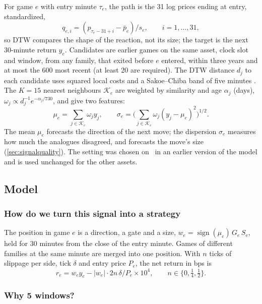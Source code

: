 For game $e$ with entry minute $\tau_e$, the path is the 31 log prices ending at entry, standardized,
\begin{equation}\label{eq:path}
  q_{e,i}=(p_{\tau_e-31+i}-\bar p_e)/s_e,\qquad i=1,\ldots,31,
\end{equation}
so DTW compares the shape of the reaction, not its size; the target is the next 30-minute return
$y_e$. Candidates are earlier games on the same asset, clock slot and window, from any family, that
exited before $e$ entered, within three years and at most the 600 most recent (at least 20 are
required). The DTW distance $d_j$ to each candidate uses squared local costs and a Sakoe--Chiba band of
five minutes \citep{Keogh2005}. The $K=15$ nearest neighbours $\mathcal{K}_e$ are weighted by
similarity and age $\alpha_j$ (days), $\omega_j\propto d_j^{-1}e^{-\alpha_j/730}$, and give two
features:
\begin{equation}\label{eq:features}
  \mu_e=\sum_{j\in\mathcal{K}_e}\omega_j y_j,\qquad
  \sigma_e=\Big(\sum_{j\in\mathcal{K}_e}\omega_j (y_j-\mu_e)^2\Big)^{1/2}.
\end{equation}
The mean $\mu_e$ forecasts the direction of the next move; the dispersion $\sigma_e$ measures how much
the analogues disagreed, and forecasts the move's size (\ref{sec:signalquality}). The setting was
chosen on \ES\ in an earlier version of the model and is used unchanged for the other assets.

\subsection{Model}\label{sec:strategy}

\subsubsection{How do we turn this signal into a strategy}

The position in game $e$ is a direction, a gate and a size,
$w_e=\operatorname{sign}(\mu_e)\,G_e\,S_e$, held for 30 minutes from the close of the entry minute.
Games of different families at the same minute are merged into one position. With $n$ ticks of
slippage per side, tick $\delta$ and entry price $P_e$, the net return in bps is
\begin{equation}\label{eq:cost}
  r_e=w_e y_e-|w_e|\cdot 2n\,\delta/P_e\times 10^4 ,\qquad n\in\{0,\tfrac14,\tfrac12\}.
\end{equation}

\subsubsection{Why 5 windows?}\label{sec:five}

